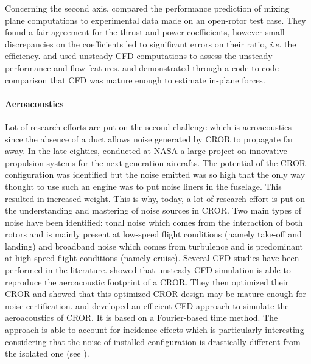 Concerning the second axis, \citet{Zachariadis2011}
compared the performance prediction of mixing plane computations
to experimental data made on an open-rotor test case.
They found a fair agreement for the thrust and power coefficients, however
small discrepancies on the coefficients led to significant errors on their ratio,
\emph{i.e.} the efficiency.
\citet{Vion2011} and \citet{Stuermer2008} used unsteady
CFD computations to assess the unsteady performance and flow features.
\citet{Stuermer2008} and \citet{Francois2013} demonstrated through a code to code comparison
that CFD was mature enough to estimate in-plane forces.

\paragraph{Aeroacoustics}
Lot of research efforts are put on the second challenge which
is aeroacoustics since the absence of a duct allows noise generated
by CROR to propagate far away.
In the late eighties, \citet{Hager1988}
conducted at NASA a large project on innovative propulsion systems for the
next generation aircrafts. The potential of the CROR configuration
was identified but the noise emitted was so high that the only way
thought to use such an engine was to put noise liners in the fuselage. This resulted in 
increased weight. This is why, today, a lot of research effort is put on the
understanding and mastering of noise sources in CROR.
Two main types of noise have been identified: tonal noise which comes from
the interaction of both rotors and is mainly present at low-speed flight conditions 
(namely take-off and landing)
and broadband noise which comes from turbulence and is predominant
at high-speed flight conditions (namely cruise).
Several CFD studies have been performed in the literature.
\citet{Peters2012} showed that unsteady CFD simulation is able
to reproduce the aeroacoustic footprint of a CROR. They then optimized
their CROR and showed that this optimized CROR design may be mature enough
for noise certification. \citet{Hoffer2012} and \citet{Ferrante2013}
developed an efficient CFD approach to simulate the aeroacoustics of CROR.
It is based on a Fourier-based time method. The approach is able to
account for incidence effects which is particularly interesting
considering that the noise of installed configuration is drastically
different from the isolated one (see \citet{Hager1988}).

